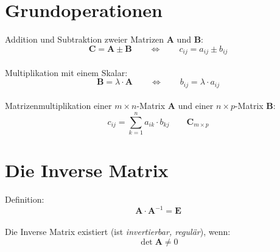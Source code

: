 \section{Grundoperationen}
Addition und Subtraktion zweier Matrizen \textbf{A} und \textbf{B}:
\[ \textbf{C}=\textbf{A}\pm\textbf{B}\qquad\Leftrightarrow\qquad c_{ij}=a_{ij}\pm b_{ij} \]
~\\
Multiplikation mit einem Skalar:
\[ \textbf{B}=\lambda\cdot\textbf{A}\qquad\Leftrightarrow\qquad b_{ij}=\lambda\cdot a_{ij} \]
~\\
Matrizenmultiplikation einer $m\times n$-Matrix \textbf{A} und einer $n\times p$-Matrix \textbf{B}:
\[ c_{ij} = \sum_{k=1}^{n}a_{ik}\cdot b_{kj} \qquad \textbf{C}_{m\times p} \]

\section{Die Inverse Matrix}
Definition:
\[ \textbf{A}\cdot\textbf{A}^{-1} = \textbf{E} \]
~\\
Die Inverse Matrix existiert (ist \textit{invertierbar, regulär}), wenn:
\[ \det\textbf{A}\neq 0 \]
